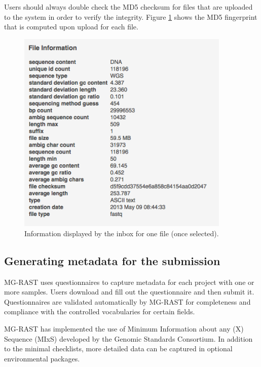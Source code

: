 \documentclass[12pt,fullpage]{report}
\begin{document}
Users should always double check the \gls{MD5} checksum for files that are uploaded to the system in order to verify the integrity. Figure \ref{fig:Inbox-File-Information} shows the MD5 fingerprint that is computed upon upload for each file.

\begin{figure}
\begin{center}
\includegraphics[width=4in]{Images/Inbox-File-Information.png}
\end{center}
\caption{
Information displayed by the inbox for one file (once selected).
}
\label{fig:Inbox-File-Information}
\end{figure}
\subsection{Generating metadata for the submission}
\label{section:generating_metadata}

MG-RAST uses questionnaires to capture metadata for each project with one or more samples. Users download and fill out the questionnaire and then submit it.
Questionnaires are validated
automatically by MG-RAST
for completeness and compliance with the controlled vocabularies for certain fields.

MG-RAST has implemented the use of Minimum Information about any (X) Sequence (MIxS)\cite{MIENS} developed by the Genomic Standards Consortium. In addition to the minimal checklists, more detailed data can be captured in optional environmental packages.
\end{document}
